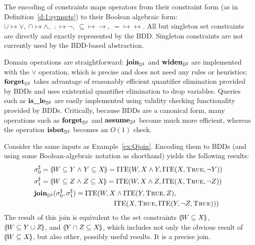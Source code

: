 The encoding of constraints maps operators from their constraint form (as in Definition~\ref{d:1:symsets}) to their Boolean algebraic form: $\cup \mapsto \vee, \ \cap \mapsto \wedge, \ \comp{} \mapsto \neg, \ \subseteq \mapsto \rightarrow, \ = \mapsto \leftrightarrow$. All but singleton set constraints are directly and exactly represented by the BDD.  Singleton constraints are not currently used by the BDD-based abstraction.

Domain operations are straightforward: $\textbf{join}_{{\mathbb{D}}^{\sharp}}$ and $\textbf{widen}_{{\mathbb{D}}^{\sharp}}$ are implemented with the $\vee$ operation, which is precise and does not need any rules or heuristics; $\textbf{forget}_{{\mathbb{D}}^{\sharp}}$ takes advantage of reasonably efficient quantifier elimination provided by BDDs and uses existential quantifier elimination to drop variables.  Queries such as $\textbf{is\_le}_{{\mathbb{D}}^{\sharp}}$ are easily implemented using validity checking functionality provided by BDDs.  Critically, because BDDs are a canonical form, many operations such as $\textbf{forget}_{{\mathbb{D}}^{\sharp}}$ and $\textbf{assume}_{{\mathbb{D}}^{\sharp}}$ become much more efficient, whereas the operation $\textbf{isbot}_{{\mathbb{D}}^{\sharp}}$ becomes an $O(1)$ check.

\begin{example}  Consider the same inputs as Example~\ref{ex:Qjoin}.  Encoding them to BDDs (and using some Boolean-algebraic notation as shorthand) yields the following results:
\begin{align*}
  & {\sigma}^{\sharp}_0 = \llparenthesis W \subseteq Y \mathrel{\wedge} Y \subseteq X \rrparenthesis =
  \textrm{ITE}(W, X \wedge Y, \textrm{ITE}(X, \textsc{True},
  \neg Y))
  \\
  & {\sigma}^{\sharp}_1 = \llparenthesis W \subseteq Z \mathrel{\wedge} Z \subseteq X \rrparenthesis =
  \textrm{ITE}(W, X \wedge Z, \textrm{ITE}(X, \textsc{True},
  \neg Z))
  \\
  & \textbf{join}_{{\mathbb{D}}^{\sharp}}({\sigma}^{\sharp}_0, {\sigma}^{\sharp}_1 ) =
  \textrm{ITE}(W, X \wedge \textrm{ITE}(Y, \textsc{True}, Z),
  \\
  & \qquad \qquad \qquad \qquad \qquad \quad \;\;
  \textrm{ITE}(X, \textsc{True}, \textrm{ITE}(Y, \neg Z, \textsc{True})))
\end{align*}
  The result of this join is equivalent to the set constraints $\llparenthesis W \subseteq X \rrparenthesis$, $\llparenthesis W \subseteq Y \cup Z \rrparenthesis$, and $\llparenthesis Y \cap Z \subseteq X \rrparenthesis$, which includes not only the obvious result of $\llparenthesis W \subseteq X \rrparenthesis$, but also other, possibly useful results.  It is a precise join.
\end{example}


